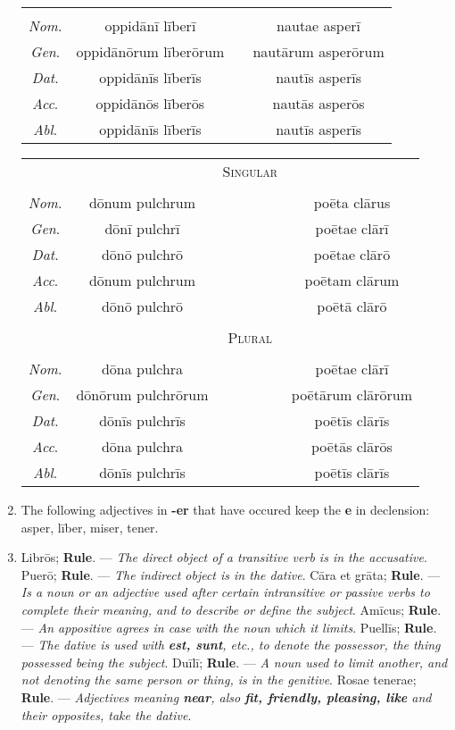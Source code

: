 \documentclass[12pt]{article}
\begin{document}
\begin{enumerate}[1.]
\begin{center}
\begin{tabular}{ c c c c }
		& & & \\
		\textit{Nom}. & oppidānī līberī & & nautae asperī \\
		\textit{Gen}. & oppidānōrum līberōrum & & nautārum asperōrum \\
		\textit{Dat}. & oppidānīs līberīs & & nautīs asperīs \\
		\textit{Acc}. & oppidānōs līberōs & & nautās asperōs \\
		\textit{Abl}. & oppidānīs līberīs & & nautīs asperīs \\
		\end{tabular}
	\end{center}
	\begin{center}
		\begin{tabular}{ c c c c }
		& & \textsc{Singular} & \\
		& & & \\
		\textit{Nom}. & dōnum pulchrum & & poēta clārus \\
		\textit{Gen}. & dōnī pulchrī & & poētae clārī \\
		\textit{Dat}. & dōnō pulchrō & & poētae clārō \\
		\textit{Acc}. & dōnum pulchrum & & poētam clārum \\
		\textit{Abl}. & dōnō pulchrō & & poētā clārō \\
		& & & \\
		& & \textsc{Plural} & \\
		& & & \\
		\textit{Nom}. & dōna pulchra & & poētae clārī \\
		\textit{Gen}. & dōnōrum pulchrōrum & & poētārum clārōrum \\
		\textit{Dat}. & dōnīs pulchrīs & & poētīs clārīs \\
		\textit{Acc}. & dōna pulchra & & poētās clārōs \\
		\textit{Abl}. & dōnīs pulchrīs & & poētīs clārīs \\
		\end{tabular}
	\end{center}
	\item The following adjectives in \textbf{-er} that have occured keep the \textbf{e} in declension: asper, līber, miser, tener.
	\item Librōs; \textbf{Rule}. --- \textit{The direct object of a transitive verb is in the accusative}. Puerō; \textbf{Rule}. --- \textit{The indirect object is in the dative}. Cāra et grāta; \textbf{Rule}. --- \textit{Is a noun or an adjective used after certain intransitive or passive verbs to complete their meaning, and to describe or define the subject}. Amīcus; \textbf{Rule}. --- \textit{An appositive agrees in case with the noun which it limits}. Puellīs; \textbf{Rule}. --- \textit{The dative is used with \textbf{est, sunt}, etc., to denote the possessor, the thing possessed being the subject}. Duīlī; \textbf{Rule}. --- \textit{A noun used to limit another, and not denoting the same person or thing, is in the genitive}. Rosae tenerae; \textbf{Rule}. --- \textit{Adjectives meaning \textbf{near}, also \textbf{fit, friendly, pleasing, like} and their opposites, take the dative}.
\end{enumerate}
\end{document}
